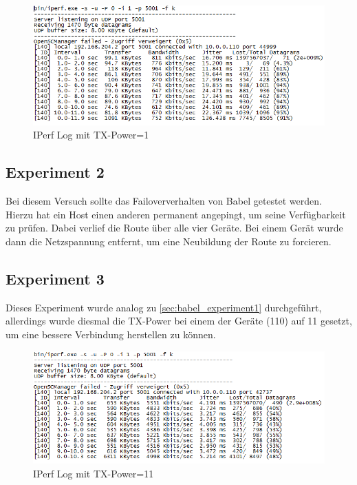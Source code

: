 \documentclass[10pt]{scrartcl}
\begin{document}
	\begin{figure}
        \centering
                \includegraphics[width=\textwidth]{img/Babel_TX1_Protokoll}
        \caption{IPerf Log mit TX-Power=1}
        \label{img:babel_iperf_tx1}
	\end{figure}
	

	
	\subsection{Experiment 2}
	Bei diesem Versuch sollte das Failoververhalten von Babel getestet werden. Hierzu hat ein Host einen anderen permanent angepingt, um seine Verfügbarkeit zu prüfen. Dabei verlief die Route über alle vier Geräte. Bei einem Gerät wurde dann die Netzspannung entfernt, um eine Neubildung der Route zu forcieren.
	
	\subsection{Experiment 3}\label{sec:babel_experiment3}
	Dieses Experiment wurde analog zu \ref{sec:babel_experiment1} durchgeführt, allerdings wurde diesmal die TX-Power bei einem der Geräte (110) auf 11 gesetzt, um eine bessere Verbindung herstellen zu können.	

	\begin{figure}
        \centering
                \includegraphics[width=\textwidth]{img/Babel_TX11_Protokoll}
        \caption{IPerf Log mit TX-Power=11}
        \label{img:babel_iperf_tx11}
	\end{figure}
	
\end{document}
